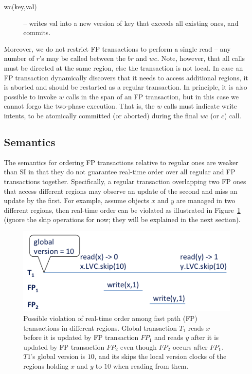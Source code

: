 \begin{description}
\item[wc(key,val)] -- writes val into a new version of key that exceeds all existing ones, and commits.
\end{description}

Moreover, we do not restrict FP transactions to perform a single read -- any number of $r$'s may be called between the $br$ and $wc$.
Note, however, that all calls must be directed at the same region, else the transaction is not local.
In case an FP transaction dynamically discovers that it needs to access additional regions, it is aborted and should be restarted as a regular transaction. 
In principle, it is also possible to invoke $w$ calls in the span of an FP transaction, but in this case we cannot forgo the two-phase execution. 
That is, the $w$ calls must indicate write intents, to be atomically committed (or aborted) during the final $wc$ (or $c$) call. 


\subsection{Semantics}
\label{ssec:fast-semantics}

The semantics for ordering FP transactions relative to regular ones are
weaker than SI in that they do not guarantee real-time order over all regular
and FP transactions together. Specifically, a regular transaction overlapping
two FP ones that access different regions may observe an update of
the second and miss an update by the first. For example, assume objects $x$ and $y$
are managed in two different regions, then real-time order can be violated as
illustrated in Figure~\ref{fig:ltx-rt} (ignore the skip operations for now; they will be explained in the next section).

\begin{figure}[h]
\includegraphics[width=\columnwidth]{LTX-RT}
\caption{Possible violation of real-time order among fast path (FP) transactions in different regions. Global transaction $T_1$
reads $x$ before it is updated by FP transaction $FP_1$ and reads $y$ after it is updated by FP transaction $FP_2$ even 
though $FP_2$ occurs after $FP_1$. $T1$'s global version is $10$, and its skips the local version clocks of the regions holding $x$ and $y$ to $10$ when reading from them.}
\label{fig:ltx-rt}
\end{figure}

